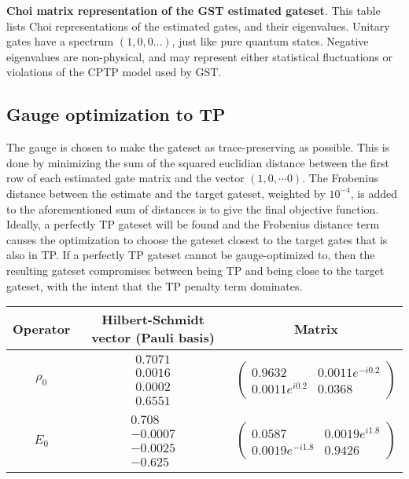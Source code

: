 {\begin{table}[h]
\begin{center}
\caption{\textbf{Choi matrix representation of the GST estimated gateset}.  This table lists Choi representations of the estimated gates, and their eigenvalues.  Unitary gates have a spectrum $(1,0,0\ldots)$, just like pure quantum states.  Negative eigenvalues are non-physical, and may represent either statistical fluctuations or violations of the CPTP model used by GST.\label{bestTargetGatesGatesetChoiTable}}
\end{center}
\end{table}

\clearpage

\subsection{Gauge optimization to TP}
The gauge is chosen to make the gateset as trace-preserving as possible.  This is done by minimizing the sum of the squared euclidian distance between the first row of each estimated gate matrix and the vector $(1,0,\cdots 0)$.  The Frobenius distance between the estimate and the target gateset, weighted by $10^{-4}$, is added to the aforementioned sum of distances is to give the final objective function.  Ideally, a perfectly TP gateset will be found and the Frobenius distance term causes the optimization to choose the gateset closest to the target gates that is also in TP.  If a perfectly TP gateset cannot be gauge-optimized to, then the resulting gateset compromises between being TP and being close to the target gateset, with the intent that the TP penalty term dominates.

\begin{table}[h]
\begin{center}
\begin{tabular}[l]{|c|c|c|}
\hline
Operator & Hilbert-Schmidt vector (Pauli basis) & Matrix \\ \hline
$\rho_{0}$ & $ \begin{array}{c}
0.7071 \\ 
0.0016 \\ 
0.0002 \\ 
0.6551
 \end{array} $
 & $ \left(\!\!\begin{array}{cc}
0.9632 & 0.0011e^{-i0.2} \\ 
0.0011e^{i0.2} & 0.0368
 \end{array}\!\!\right) $
 \\ \hline
$E_{0}$ & $ \begin{array}{c}
0.708 \\ 
-0.0007 \\ 
-0.0025 \\ 
-0.625
 \end{array} $
 & $ \left(\!\!\begin{array}{cc}
0.0587 & 0.0019e^{i1.8} \\ 
0.0019e^{-i1.8} & 0.9426
 \end{array}\!\!\right) $
 \\ \hline
\end{tabular}


\end{center}
\end{table}}
